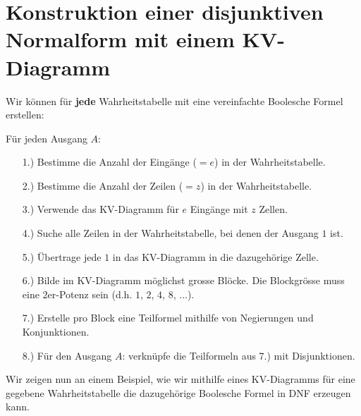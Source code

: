 \section{Konstruktion einer disjunktiven Normalform mit einem \acs{KV}-Diagramm}

Wir können für \textbf{jede} Wahrheitstabelle mit eine vereinfachte Boolesche Formel erstellen:

\begin{important}
Für jeden Ausgang $A$:
\begin{enumerate}
\item[1.)] Bestimme die Anzahl der Eingänge ($=e$) in der Wahrheitstabelle.
\item[2.)] Bestimme die Anzahl der Zeilen ($=z$) in der Wahrheitstabelle.
\item[3.)] Verwende das \acs{KV}-Diagramm für $e$ Eingänge mit $z$ Zellen.
\item[4.)] Suche alle Zeilen in der Wahrheitstabelle, bei denen der Ausgang $1$ ist.
\item[5.)] Übertrage jede $1$ in das \acs{KV}-Diagramm in die dazugehörige Zelle.
\item[6.)] Bilde im \acs{KV}-Diagramm möglichst grosse Blöcke. Die Blockgrösse muss eine $2$er-Potenz sein (d.h. $1$, $2$, $4$, $8$, $\dots$).
\item[7.)] Erstelle pro Block eine Teilformel mithilfe von Negierungen und Konjunktionen.
\item[8.)] Für den Ausgang $A$: verknüpfe die Teilformeln aus 7.) mit Disjunktionen.
\end{enumerate}
\end{important}

Wir zeigen nun an einem Beispiel, wie wir mithilfe eines \ac{KV}-Diagramms für eine gegebene Wahrheitstabelle die dazugehörige Boolesche Formel in \ac{DNF} erzeugen kann.

